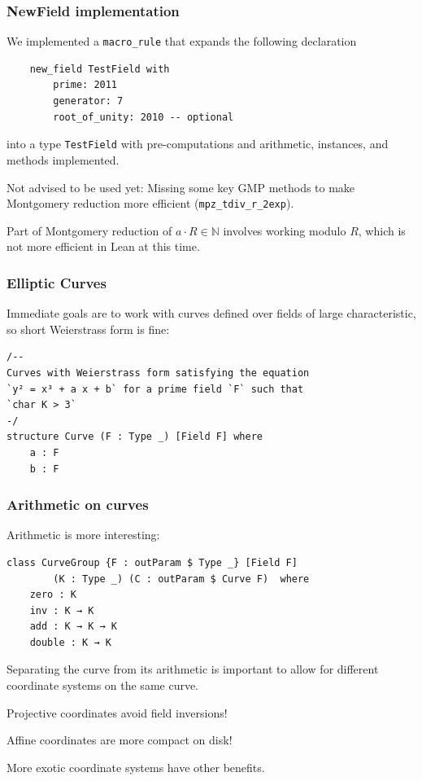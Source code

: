 \documentclass[options]{beamer}
\begin{document}
\begin{frame}[fragile]
    \frametitle{NewField implementation}

    We implemented a \verb+macro_rule+ that expands the following declaration

    \begin{verbatim}
    new_field TestField with
        prime: 2011
        generator: 7
        root_of_unity: 2010 -- optional
    \end{verbatim}

    into a type \verb+TestField+ with pre-computations and arithmetic, instances, and methods implemented. 

    \vspace{6pt}
    \pause

    Not advised to be used yet: Missing some key GMP methods to make Montgomery reduction more efficient
    (\verb+mpz_tdiv_r_2exp+).

    \vspace{6pt}

    Part of Montgomery reduction of $a\cdot R \in \mathbb N$ involves working modulo $R$, which is not more efficient in Lean at this time.

\end{frame}
\begin{frame}[fragile]
    \frametitle{Elliptic Curves}

    Immediate goals are to work with curves defined over fields of large characteristic, so short Weierstrass form is fine:

    \begin{verbatim}
/--
Curves with Weierstrass form satisfying the equation 
`y² = x³ + a x + b` for a prime field `F` such that 
`char K > 3`
-/
structure Curve (F : Type _) [Field F] where
    a : F
    b : F
    \end{verbatim}

\end{frame}

\begin{frame}[fragile]
    \frametitle{Arithmetic on curves}

    Arithmetic is more interesting:
    
    \begin{verbatim}
class CurveGroup {F : outParam $ Type _} [Field F] 
        (K : Type _) (C : outParam $ Curve F)  where 
    zero : K
    inv : K → K
    add : K → K → K
    double : K → K
    \end{verbatim}
    
    \vspace{6pt}
    \pause

    Separating the curve from its arithmetic is important to allow for different coordinate systems on the same curve.

    \vspace{6pt}
    \pause
    
    Projective coordinates avoid field inversions!

    Affine coordinates are more compact on disk!

    More exotic coordinate systems have other benefits.

\end{frame}
\end{document}
